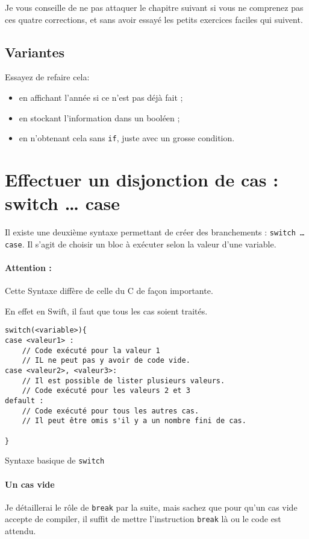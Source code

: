 Je vous conseille de ne pas attaquer le chapitre suivant
si vous ne comprenez pas ces quatre corrections,
et sans avoir essayé les petits exercices faciles qui suivent.
\subsection{Variantes}
Essayez de refaire cela:
\begin{itemize}

\item en affichant l'année si ce n'est pas déjà fait ;
\item en stockant l'information dans un booléen ;
\item en n'obtenant cela sans \texttt{if}, juste avec un grosse condition.

\end{itemize}
\section{Effectuer un disjonction de cas : switch … case}
Il existe une deuxième syntaxe permettant de créer des branchements :
\texttt{switch … case}.
Il s'agit de choisir un bloc à exécuter selon la valeur d'une variable.
\paragraph{Attention :}Cette Syntaxe diffère de celle du C de façon importante.


En effet en Swift, il faut que tous les cas soient traités.
\begin{listing}[h]
\begin{verbatim}
switch(<variable>){
case <valeur1> :
    // Code exécuté pour la valeur 1
    // IL ne peut pas y avoir de code vide.
case <valeur2>, <valeur3>:
    // Il est possible de lister plusieurs valeurs.
    // Code exécuté pour les valeurs 2 et 3
default :
    // Code exécuté pour tous les autres cas.
    // Il peut être omis s'il y a un nombre fini de cas.

}
\end{verbatim}
\caption{Syntaxe basique de \texttt{switch}}
\end{listing}
\paragraph{Un cas vide}
Je détaillerai le rôle de \texttt{break} par la suite, mais sachez que pour qu'un cas vide accepte de compiler, il suffit de mettre l'instruction \texttt{break} là ou le code est attendu.


